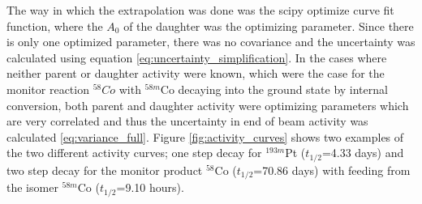 The way in which the extrapolation was done was the scipy optimize curve fit function, where the $A_0$ of the daughter was the optimizing parameter. Since there is only one optimized parameter, there was no covariance and the uncertainty was calculated using equation \ref{eq:uncertainty_simplification}.  In the cases where neither parent or daughter activity were known, which were the case for the monitor reaction $^{58}Co$ with $^{58m}$Co decaying into the ground state by internal conversion, both parent and daughter activity were optimizing parameters which are very correlated and thus the uncertainty in end of beam activity was calculated \ref{eq:variance_full}. Figure \ref{fig:activity_curves} shows two examples of the two different activity curves; one step decay for $^{193m}$Pt ($t_{1/2}$=4.33 days) and two step decay for the monitor product $^{58}$Co ($t_{1/2}$=70.86 days) with feeding from the isomer $^{58m}$Co ($t_{1/2}$=9.10 hours).  


